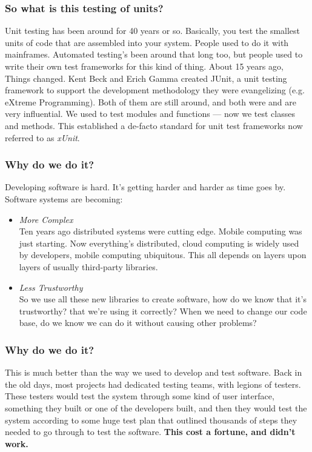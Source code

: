 \documentclass[t, 10pt]{beamer}
\begin{document}
\begin{frame}
\frametitle{So what is this testing of units?}
Unit testing has been around for 40 years or so.  Basically, you test the smallest units of code that are assembled into your system.  People used to do it with mainframes.  Automated testing's been around that long too, but people used to write their own test frameworks for this kind of thing.  About 15 years ago, Things changed.
\newline
\newline
Kent Beck and Erich Gamma created JUnit, a unit testing framework to support the development methodology they were evangelizing (e.g. eXtreme Programming).  Both of them are still around, and both were and are very influential.  We used to test modules and functions --- now we test classes and methods.
\newline
\newline
This established a de-facto standard for unit test frameworks now referred to as \textit{xUnit}.
\end{frame}

\begin{frame}
\frametitle{Why do we do it?}
Developing software is hard.  It's getting harder and harder as time goes by.  Software systems are becoming:
\begin{itemize}
\item \textit{More Complex} \\
Ten years ago distributed systems were cutting edge.  Mobile computing was just starting.  Now everything's distributed, cloud computing is widely used by developers, mobile computing ubiquitous.  This all depends on layers upon layers of usually third-party libraries.
\item \textit{Less Trustworthy} \\
So we use all these new libraries to create software, how do we know that it's trustworthy? that we're using it correctly? When we need to change our code base, do we know we can do it without causing other problems?
\end{itemize}

\end{frame}

\begin{frame}
\frametitle{Why do we do it?}
This is much better than the way we used to develop and test software.
\newline
\newline
\newline
Back in the old days, most projects had dedicated testing teams, with legions of testers.  These testers would test the system through some kind of user interface, something they built or one of the developers built, and then they would test the system according to some huge test plan that outlined thousands of steps they needed to go through to test the software.
\newline
\newline
\newline
\textbf{This cost a fortune, and didn't work.}
\end{frame}
\end{document}
